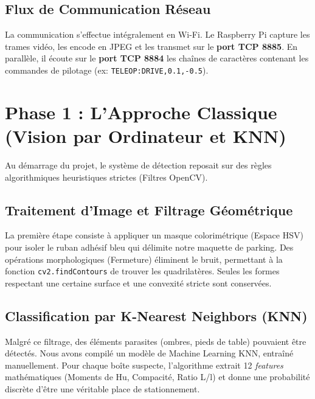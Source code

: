 \documentclass[12pt,a4paper]{article}
\begin{document}
\subsection{Flux de Communication Réseau}
La communication s'effectue intégralement en Wi-Fi. Le Raspberry Pi capture les trames vidéo, les encode en JPEG et les transmet sur le \textbf{port TCP 8885}. En parallèle, il écoute sur le \textbf{port TCP 8884} les chaînes de caractères contenant les commandes de pilotage (ex: \texttt{TELEOP:DRIVE,0.1,-0.5}).


\section{Phase 1 : L'Approche Classique (Vision par Ordinateur et KNN)}
Au démarrage du projet, le système de détection reposait sur des règles algorithmiques heuristiques strictes (Filtres OpenCV).

\subsection{Traitement d'Image et Filtrage Géométrique}
La première étape consiste à appliquer un masque colorimétrique (Espace HSV) pour isoler le ruban adhésif bleu qui délimite notre maquette de parking. Des opérations morphologiques (Fermeture) éliminent le bruit, permettant à la fonction \texttt{cv2.findContours} de trouver les quadrilatères.
Seules les formes respectant une certaine surface et une convexité stricte sont conservées.

\subsection{Classification par K-Nearest Neighbors (KNN)}
Malgré ce filtrage, des éléments parasites (ombres, pieds de table) pouvaient être détectés. Nous avons compilé un modèle de Machine Learning KNN, entraîné manuellement. Pour chaque boîte suspecte, l'algorithme extrait 12 \textit{features} mathématiques (Moments de Hu, Compacité, Ratio L/l) et donne une probabilité discrète d'être une véritable place de stationnement.
\end{document}
